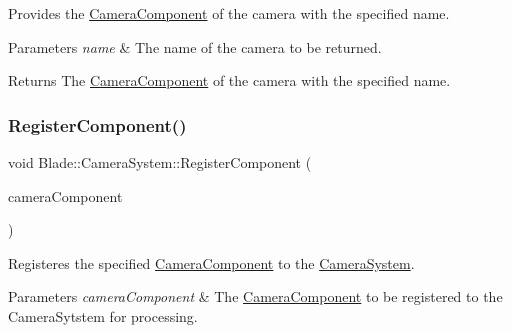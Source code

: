 Provides the \hyperlink{class_blade_1_1_camera_component}{Camera\+Component} of the camera with the specified name. 


\begin{DoxyParams}{Parameters}
{\em name} & The name of the camera to be returned. \\
\hline
\end{DoxyParams}
\begin{DoxyReturn}{Returns}
The \hyperlink{class_blade_1_1_camera_component}{Camera\+Component} of the camera with the specified name. 
\end{DoxyReturn}
\mbox{\label{class_blade_1_1_camera_system_a67a9d2ce6b3f06212dfe882dab6334c6}} 
\subsubsection{\texorpdfstring{Register\+Component()}{RegisterComponent()}}
{\footnotesize\ttfamily void Blade\+::\+Camera\+System\+::\+Register\+Component (\begin{DoxyParamCaption}\item[{\hyperlink{class_blade_1_1_camera_component}{Camera\+Component} $\ast$}]{camera\+Component }\end{DoxyParamCaption})\hspace{0.3cm}{\ttfamily [noexcept]}}



Registeres the specified \hyperlink{class_blade_1_1_camera_component}{Camera\+Component} to the \hyperlink{class_blade_1_1_camera_system}{Camera\+System}. 


\begin{DoxyParams}{Parameters}
{\em camera\+Component} & The \hyperlink{class_blade_1_1_camera_component}{Camera\+Component} to be registered to the Camera\+Sytstem for processing. \\
\hline
\end{DoxyParams}
\mbox{\label{class_blade_1_1_camera_system_a24ae6ba288185e4c2e915296e2b3a854}} 
